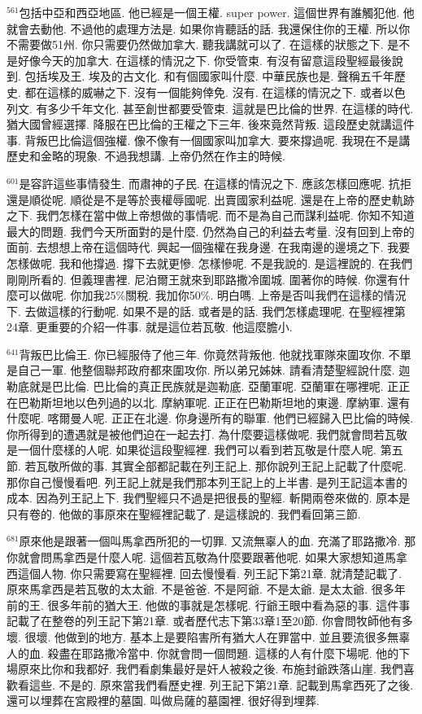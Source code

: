\documentclass{book}
\begin{document}
$^{561}$包括中亞和西亞地區.
他已經是一個王權.
super power.
這個世界有誰觸犯他.
他就會去動他.
不過他的處理方法是.
如果你肯聽話的話.
我還保住你的王權.
所以你不需要做51州.
你只需要仍然做加拿大.
聽我講就可以了.
在這樣的狀態之下.
是不是好像今天的加拿大.
在這樣的情況之下.
你受管束.
有沒有留意這段聖經最後說到.
包括埃及王.
埃及的古文化.
和有個國家叫什麼.
中華民族也是.
聲稱五千年歷史.
都在這樣的威嚇之下.
沒有一個能夠倖免.
沒有.
在這樣的情況之下.
或者以色列文.
有多少千年文化.
甚至創世都要受管束.
這就是巴比倫的世界.
在這樣的時代.
猶大國曾經選擇.
降服在巴比倫的王權之下三年.
後來竟然背叛.
這段歷史就講這件事.
背叛巴比倫這個強權.
像不像有一個國家叫加拿大.
要來撐過呢.
我現在不是講歷史和金略的現象.
不過我想講.
上帝仍然在作主的時候.

$^{601}$是容許這些事情發生.
而肅神的子民.
在這樣的情況之下.
應該怎樣回應呢.
抗拒還是順從呢.
順從是不是等於喪權辱國呢.
出賣國家利益呢.
還是在上帝的歷史軌跡之下.
我們怎樣在當中做上帝想做的事情呢.
而不是為自己而謀利益呢.
你知不知道最大的問題.
我們今天所面對的是什麼.
仍然為自己的利益去考量.
沒有回到上帝的面前.
去想想上帝在這個時代.
興起一個強權在我身邊.
在我南邊的邊境之下.
我要怎樣做呢.
我和他撐過.
撐下去就更慘.
怎樣慘呢.
不是我說的.
是這裡說的.
在我們剛剛所看的.
但義理書裡.
尼泊爾王就來到耶路撒冷圍城.
圍著你的時候.
你還有什麼可以做呢.
你加我25\%關稅.
我加你50\%.
明白嗎.
上帝是否叫我們在這樣的情況下.
去做這樣的行動呢.
如果不是的話.
或者是的話.
我們怎樣處理呢.
在聖經裡第24章.
更重要的介紹一件事.
就是這位若瓦敬.
他這麼膽小.

$^{641}$背叛巴比倫王.
你已經服侍了他三年.
你竟然背叛他.
他就找軍隊來圍攻你.
不單是自己一軍.
他整個聯邦政府都來圍攻你.
所以弟兄姊妹.
請看清楚聖經說什麼.
迦勒底就是巴比倫.
巴比倫的真正民族就是迦勒底.
亞蘭軍呢.
亞蘭軍在哪裡呢.
正正在巴勒斯坦地以色列過的以北.
摩納軍呢.
正正在巴勒斯坦地的東邊.
摩納軍.
還有什麼呢.
喀爾曼人呢.
正正在北邊.
你身邊所有的聯軍.
他們已經歸入巴比倫的時候.
你所得到的遭遇就是被他們迫在一起去打.
為什麼要這樣做呢.
我們就會問若瓦敬是一個什麼樣的人呢.
如果從這段聖經裡.
我們可以看到若瓦敬是什麼人呢.
第五節.
若瓦敬所做的事.
其實全部都記載在列王記上.
那你說列王記上記載了什麼呢.
那你自己慢慢看吧.
列王記上就是我們那本列王記上的上半書.
是列王記這本書的成本.
因為列王記上下.
我們聖經只不過是把很長的聖經.
斬開兩卷來做的.
原本是只有卷的.
他做的事原來在聖經裡記載了.
是這樣說的.
我們看回第三節.

$^{681}$原來他是跟著一個叫馬拿西所犯的一切罪.
又流無辜人的血.
充滿了耶路撒冷.
那你就會問馬拿西是什麼人呢.
這個若瓦敬為什麼要跟著他呢.
如果大家想知道馬拿西這個人物.
你只需要寫在聖經裡.
回去慢慢看.
列王記下第21章.
就清楚記載了.
原來馬拿西是若瓦敬的太太爺.
不是爸爸.
不是阿爺.
不是太爺.
是太太爺.
很多年前的王.
很多年前的猶大王.
他做的事就是怎樣呢.
行爺王眼中看為惡的事.
這件事記載了在整卷的列王記下第21章.
或者歷代志下第33章1至20節.
你會問牧師他有多壞.
很壞.
他做到的地方.
基本上是要陷害所有猶大人在罪當中.
並且要流很多無辜人的血.
殺盡在耶路撒冷當中.
你就會問一個問題.
這樣的人有什麼下場呢.
他的下場原來比你和我都好.
我們看劇集最好是奸人被殺之後.
布施封爺跌落山崖.
我們喜歡看這些.
不是的.
原來當我們看歷史裡.
列王記下第21章.
記載到馬拿西死了之後.
還可以埋葬在宮殿裡的墓園.
叫做烏薩的墓園裡.
很好得到埋葬.
\end{document}

